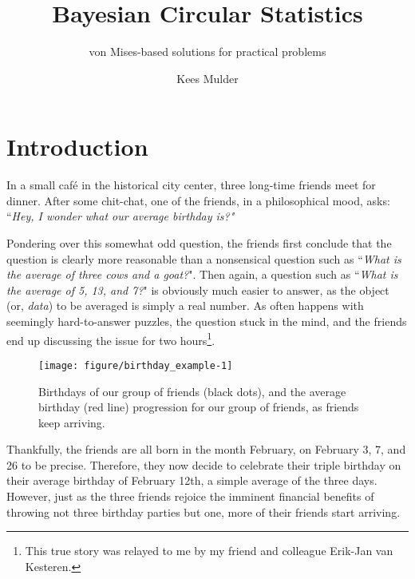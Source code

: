 \documentclass[12pt, a4paper]{book}\usepackage[]{graphicx}\usepackage[]{color}
\title{Bayesian Circular Statistics}
\subtitle{von Mises-based solutions for practical problems}
\author{Kees Mulder}
\makeatletter
\def\maxwidth{ %
  \ifdim\Gin@nat@width>\linewidth
    \linewidth
  \else
    \Gin@nat@width
  \fi
}
\newenvironment{knitrout}{}{} %
\makeatother
\begin{document}
\frontmatter

\maketitle

\tableofcontents



\chapter{Introduction}
\label{intro}

In a small caf\'e in the historical city center, three long-time friends meet for dinner. After some chit-chat, one of the friends, in a philosophical mood, asks: ``\textit{Hey, I wonder what our average birthday is?"}

Pondering over this somewhat odd question, the friends first conclude that the question is clearly more reasonable than a nonsensical question such as ``\textit{What is the average of three cows and a goat?}". Then again, a question such as ``\textit{What is the average of 5, 13, and 7?}" is obviously much easier to answer, as the object (or, \textit{data}) to be averaged is simply a real number. As often happens with seemingly hard-to-answer puzzles, the question stuck in the mind, and the friends end up discussing the issue for two hours\footnote{This true story was relayed to me by my friend and colleague Erik-Jan van Kesteren.}.


\begin{figure}
\begin{knitrout}
\color{fgcolor}
\texttt{[image: figure/birthday\_example-1]} 

\end{knitrout}
\caption{Birthdays of our group of friends (black dots), and the average birthday (red line) progression for our group of friends, as friends keep arriving.}
\label{birthday_example}
\end{figure}


Thankfully, the friends are all born in the month February, on February 3, 7, and 26 to be precise. Therefore, they now decide to celebrate their triple birthday on their average birthday of February 12th, a simple average of the three days. However, just as the three friends rejoice the imminent financial benefits of throwing not three birthday parties but one, more of their friends start arriving.
\end{document}
